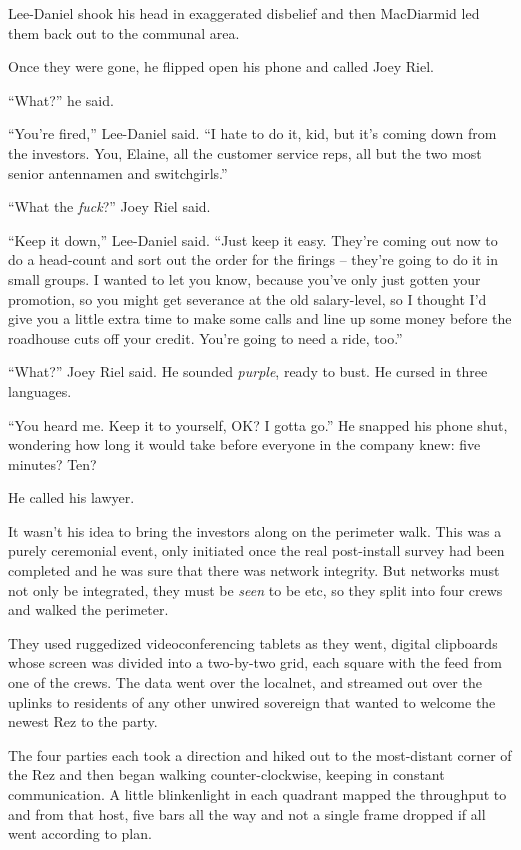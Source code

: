 Lee-Daniel shook his head in exaggerated disbelief and then MacDiarmid 
led them back out to the communal area.

Once they were gone, he flipped open his phone and called Joey Riel.

“What?” he said.

“You're fired,” Lee-Daniel said. “I hate to do it, kid, but it's 
coming down from the investors. You, Elaine, all the customer service 
reps, all but the two most senior antennamen and switchgirls.”

“What the \emph{fuck}?” Joey Riel said.

“Keep it down,” Lee-Daniel said. “Just keep it easy. They're 
coming out now to do a head-count and sort out the order for the 
firings -- they're going to do it in small groups. I wanted to let you 
know, because you've only just gotten your promotion, so you might get 
severance at the old salary-level, so I thought I'd give you a little 
extra time to make some calls and line up some money before the 
roadhouse cuts off your credit. You're going to need a ride, too.”

“What?” Joey Riel said. He sounded \emph{purple}, ready to bust. He 
cursed in three languages.

“You heard me. Keep it to yourself, OK? I gotta go.” He snapped his 
phone shut, wondering how long it would take before everyone in the 
company knew: five minutes? Ten?

He called his lawyer.

\tb

It wasn't his idea to bring the investors along on the perimeter walk. 
This was a purely ceremonial event, only initiated once the real 
post-install survey had been completed and he was sure that there was 
network integrity. But networks must not only be integrated, they must 
be \emph{seen} to be etc, so they split into four crews and walked the 
perimeter.

They used ruggedized videoconferencing tablets as they went, digital 
clipboards whose screen was divided into a two-by-two grid, each square 
with the feed from one of the crews. The data went over the localnet, 
and streamed out over the uplinks to residents of any other unwired 
sovereign that wanted to welcome the newest Rez to the party.

The four parties each took a direction and hiked out to the 
most-distant corner of the Rez and then began walking 
counter-clockwise, keeping in constant communication. A little 
blinkenlight in each quadrant mapped the throughput to and from that 
host, five bars all the way and not a single frame dropped if all went 
according to plan.

